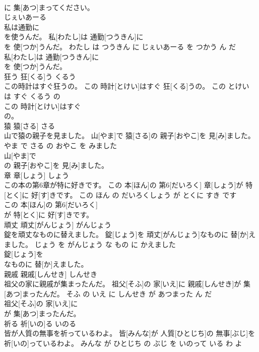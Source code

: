 \documentclass[8pt]{extreport}
\begin{document}
\begin{CJK}{UTF8}{min}
\\	に 集[あつ]まってください。			
\\	[じぇいあーる]	じぇいあーる	
\\	私は通勤に
\\	を使うんだ。	私[わたし]は 通勤[つうきん]に 
\\	[じぇいあーる]を 使[つか]うんだ。	わたし は つうきん に じぇいあーる を つかう ん だ	
\\	私[わたし]は 通勤[つうきん]に
\\	を 使[つか]うんだ。			
\\	狂う	狂[くる]う	くるう	
\\	この時計はすぐ狂うの。	この 時計[とけい]はすぐ 狂[くる]うの。	この とけい は すぐ くるう の	
\\	この 時計[とけい]はすぐ
\\	の。			
\\	猿	猿[さる]	さる	
\\	山で猿の親子を見ました。	山[やま]で 猿[さる]の 親子[おやこ]を 見[み]ました。	やま で さる の おやこ を みました	
\\	山[やま]で
\\	の 親子[おやこ]を 見[み]ました。			
\\	章	章[しょう]	しょう	
\\	この本の第6章が特に好きです。	この 本[ほん]の 第6[だいろく] 章[しょう]が 特[とく]に 好[す]きです。	この ほん の だいろくしょう が とくに すき です	
\\	この 本[ほん]の 第6[だいろく]
\\	が 特[とく]に 好[す]きです。			
\\	頑丈	頑丈[がんじょう]	がんじょう	
\\	錠を頑丈なものに替えました。	錠[じょう]を 頑丈[がんじょう]なものに 替[か]えました。	じょう を がんじょう な もの に かえました	
\\	錠[じょう]を
\\	なものに 替[か]えました。			
\\	親戚	親戚[しんせき]	しんせき	
\\	祖父の家に親戚が集まったんだ。	祖父[そふ]の 家[いえ]に 親戚[しんせき]が 集[あつ]まったんだ。	そふ の いえ に しんせき が あつまった ん だ	
\\	祖父[そふ]の 家[いえ]に
\\	が 集[あつ]まったんだ。			
\\	祈る	祈[いの]る	いのる	
\\	皆が人質の無事を祈っているわよ。	皆[みんな]が 人質[ひとじち]の 無事[ぶじ]を 祈[いの]っているわよ。	みんな が ひとじち の ぶじ を いのって いる わ よ	

\end{CJK}
\end{document}
